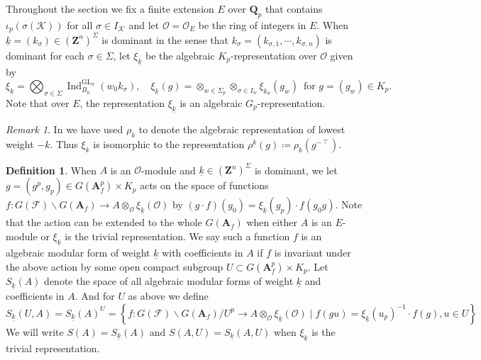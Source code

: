 \documentclass[leqno]{amsart}
\theoremstyle{definition}
\newtheorem{defn}[thm]{Definition}
\theoremstyle{remark}
\newtheorem{rem}[thm]{Remark}
\newcommand{\oo}{\mathcal{O}}
\newcommand{\Z}{{\mathbf{Z}}}
\newcommand{\Qp}{\mathbf{Q}_p}
\newcommand{\A}{\mathbf A}
\DeclareMathOperator{\Ind}{Ind}
\DeclareMathOperator{\GL}{GL}
\newcommand{\F}{{\mathcal{F}}} %
\newcommand{\K}{{\mathcal{K}}} %
\newcommand{\wt}[1]{\underline{ #1 }}
\begin{document}
Throughout the section
we fix a finite extension $E$ over $\Qp$
that contains $\iota_p(\sigma(\K))$
for all $\sigma\in I_\K$ and
let $\oo=\oo_E$ be the ring of integers in $E$.
When $\wt{k}=(k_\sigma)\in (\Z^n)^{\Sigma}$
is dominant in the sense that
$k_\sigma=(k_{\sigma,1},\cdots,k_{\sigma,n})$
is dominant for each $\sigma\in \Sigma$,
let $\xi_{\wt{k}}$ be
the algebraic $K_p$-representation over $\oo$ given by
\begin{equation}\label{def:algrep}
	\xi_{\wt{k}}=\bigotimes_{\sigma\in \Sigma}
	\Ind_{B_n}^{\GL_n}(w_0k_{\sigma}),\quad
	\xi_{\wt{k}}(g)=
	\otimes_{w\in \Sigma_p}
	\otimes_{\sigma\in I_w}\xi_{k_\sigma}(g_w)\,
	\text{ for } g=(g_w)\in K_p.
\end{equation}
Note that over $E$, the representation $\xi_{\wt{k}}$ 
is an algebraic $G_p$-representation.

\begin{rem}
    In \cite{lee} we have used  $\rho_k$ to denote
	the algebraic representation of lowest weight  $-k$.
	Thus $\xi_k$ is isomorphic to the representation 
	$\rho^k(g)\coloneqq \rho_k(g^{-\intercal})$.
\end{rem}




\begin{defn}\label{def:algform}
When $A$ is an $\oo$-module and  
$\wt{k}\in (\Z^n)^{\Sigma}$ is dominant,
we let $g=(g^p,g_p)\in G(\A_f^p)\times K_p$ acts on 
the space of functions
$f\colon G(\F)\backslash G(\A_f)\to A\otimes_{\oo}\xi_{\wt{k}}(\oo)$
by $(g\cdot f)(g_0)=\xi_{\wt{k}}(g_p)\cdot f(g_0g)$.
Note that the action can be extended to the whole $G(\A_f)$
when either $A$ is an $E$-module or $\xi_{\wt{k}}$
is the trivial representation.
We say such a function $f$ is an algebraic modular form of
weight $\wt{k}$ with coefficients in $A$
if $f$ is invariant under the above action 
by some open compact subgroup
$U\subset G(\A_f^p)\times K_p$.
Let $S_{\wt{k}}(A)$
denote the space of all algebraic modular forms
of weight $\wt{k}$ and coefficients in $A$.
And for $U$ as above we define
\begin{equation}
S_{\wt{k}}(U,A)=
S_{\wt{k}}(A)^U=
\left\{ f: G(\F)\backslash G(\A_f)/U^p 
\rightarrow A\otimes_{\oo}\xi_{\wt{k}}(\oo)
\mid f(gu)=\xi_{\wt{k}}(u_p)^{-1}\cdot f(g), u\in U\right\} 
\end{equation}
We will write $S(A)=S_{\wt{k}}(A)$ and
$S(A,U)=S_{\wt{k}}(A,U)$
when $\xi_{\wt{k}}$ is the trivial representation.
\end{defn}
\end{document}
